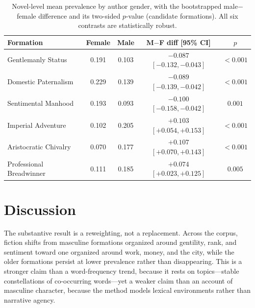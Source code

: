\documentclass[11pt]{article}
\begin{document}
\begin{table}[htbp]
\centering
\caption{Novel-level mean prevalence by author gender, with the bootstrapped
male$-$female difference and its two-sided $p$-value (candidate formations). All
six contrasts are statistically robust.}
\label{tab:gender}
\small
\begin{tabular}{l c c c c}
\toprule
Formation & Female & Male & M$-$F diff [95\% CI] & $p$ \\
\midrule
Gentlemanly Status       & 0.191 & 0.103 & $-0.087$ $[-0.132, -0.043]$ & $<0.001$ \\
Domestic Paternalism     & 0.229 & 0.139 & $-0.089$ $[-0.139, -0.042]$ & $<0.001$ \\
Sentimental Manhood      & 0.193 & 0.093 & $-0.100$ $[-0.158, -0.042]$ & $0.001$ \\
Imperial Adventure       & 0.102 & 0.205 & $+0.103$ $[+0.054, +0.153]$ & $<0.001$ \\
Aristocratic Chivalry    & 0.070 & 0.177 & $+0.107$ $[+0.070, +0.143]$ & $<0.001$ \\
Professional Breadwinner & 0.111 & 0.185 & $+0.074$ $[+0.023, +0.125]$ & $0.005$ \\
\bottomrule
\end{tabular}
\end{table}

\section{Discussion}

The substantive result is a reweighting, not a replacement. Across the corpus,
fiction shifts from masculine formations organized around gentility, rank, and
sentiment toward one organized around work, money, and the city, while the older
formations persist at lower prevalence rather than disappearing. This is a
stronger claim than a word-frequency trend, because it rests on topics---stable
constellations of co-occurring words---yet a weaker claim than an account of
masculine character, because the method models lexical environments rather than
narrative agency.
\end{document}
